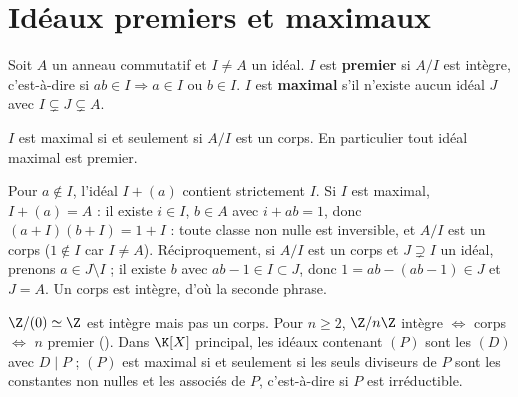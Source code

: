 \section{Idéaux premiers et maximaux}
\begin{definition}
Soit $A$ un anneau commutatif et $I\neq A$ un idéal. $I$ est \textbf{premier} si $A/I$ est intègre, c'est-à-dire si $ab\in I\Rightarrow a\in I$ ou $b\in I$. $I$ est \textbf{maximal} s'il n'existe aucun idéal $J$ avec $I\subsetneq J\subsetneq A$.
\end{definition}
\begin{theoreme}\label{thm-maximal}
$I$ est maximal si et seulement si $A/I$ est un corps. En particulier tout idéal maximal est premier.
\end{theoreme}
\begin{preuve}
Pour $a\notin I$, l'idéal $I+(a)$ contient strictement $I$. Si $I$ est maximal, $I+(a)=A$ : il existe $i\in I$, $b\in A$ avec $i+ab=1$, donc $(a+I)(b+I)=1+I$ : toute classe non nulle est inversible, et $A/I$ est un corps ($1\notin I$ car $I\neq A$). Réciproquement, si $A/I$ est un corps et $J\supsetneq I$ un idéal, prenons $a\in J\setminus I$ ; il existe $b$ avec $ab-1\in I\subset J$, donc $1=ab-(ab-1)\in J$ et $J=A$. Un corps est intègre, d'où la seconde phrase.
\end{preuve}
\begin{preuve}
$\Z/(0)\simeq\Z$ est intègre mais pas un corps. Pour $n$, $\Z/n\Z$ intègre $\iff$ corps $\iff$ $n$ premier (). Dans $\K[X]$ principal, les idéaux contenant $(P)$ sont les $(D)$ avec $D\mid P$ ; $(P)$ est maximal si et seulement si les seuls diviseurs de $P$ sont les constantes non nulles et les associés de $P$, c'est-à-dire si $P$ est irréductible.
\end{preuve}

